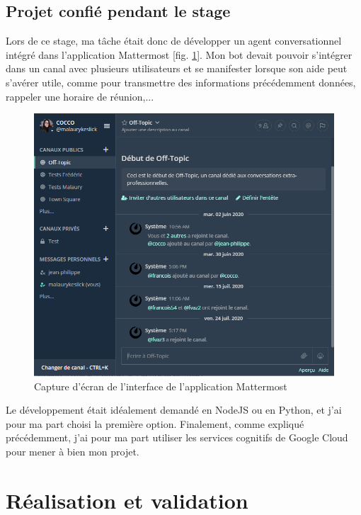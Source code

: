 \documentclass[stage2a]{tnreport} %
\begin{document}
\section{Projet confié pendant le stage}

Lors de ce stage, ma tâche était donc de développer un agent conversationnel intégré dans l'application Mattermost [fig. \ref{MM}]. Mon bot devait pouvoir s'intégrer dans un canal avec plusieurs utilisateurs et se manifester lorsque son aide peut s'avérer utile, comme pour transmettre des informations précédemment données, rappeler une horaire de réunion,... \\

\begin{figure}[h!]
    \centering
    \includegraphics[width=\textwidth]{figures/Mattermost.PNG}
    \caption{Capture d'écran de l'interface de l'application Mattermost}
    \label{MM}
\end{figure}

Le développement était idéalement demandé en NodeJS ou en Python, et j'ai pour ma part choisi la première option. Finalement, comme expliqué précédemment, j'ai pour ma part utiliser les services cognitifs de Google Cloud pour mener à bien mon projet. 

\clearpage

\chapter{Réalisation et validation}
\end{document}
